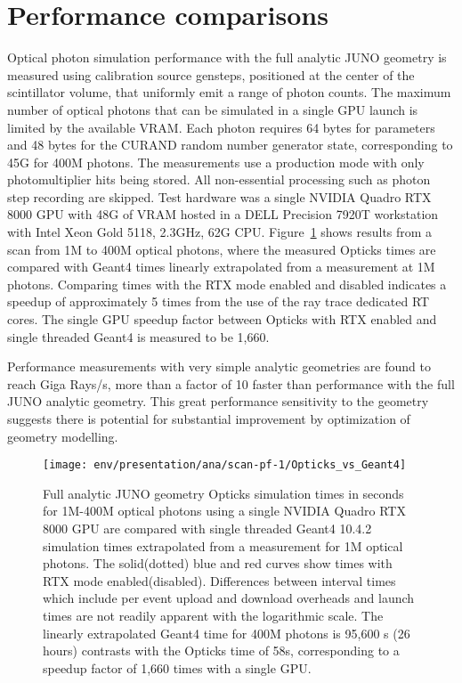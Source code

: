 \documentclass{webofc}
\begin{document}
\section{Performance comparisons}

Optical photon simulation performance with the full analytic JUNO geometry is measured 
using calibration source gensteps, positioned at the center of the scintillator volume, 
that uniformly emit a range of photon counts. 
The maximum number of optical photons that can be simulated in a single GPU launch is
limited by the available VRAM. Each photon requires 64 bytes for parameters  
and 48 bytes for the CURAND random number generator state, corresponding to 45G for 400M photons.
The measurements use a production mode with only photomultiplier hits being stored.
All non-essential processing such as photon step recording are skipped. Test hardware was a single 
NVIDIA Quadro RTX 8000 GPU with 48G of VRAM hosted in a DELL Precision 7920T workstation with 
Intel Xeon Gold 5118, 2.3GHz, 62G CPU. 
Figure~\ref{scanpf1vs} shows results from a scan from 1M to 400M optical photons, where the measured Opticks 
times are compared with Geant4 times linearly extrapolated from a measurement at 1M photons. 
Comparing times with the RTX mode enabled and disabled indicates a speedup of approximately 5 times
from the use of the ray trace dedicated RT cores.
The single GPU speedup factor between Opticks with RTX enabled and single threaded Geant4 
is measured to be 1,660.   

Performance measurements with very simple analytic geometries are found to reach Giga Rays/s, 
more than a factor of 10 faster than performance with the full JUNO analytic geometry. 
This great performance sensitivity to the geometry suggests there is potential for 
substantial improvement by optimization of geometry modelling. 
%
\begin{figure}
\centering
\texttt{[image: env/presentation/ana/scan-pf-1/Opticks\_vs\_Geant4]}
\caption{Full analytic JUNO geometry Opticks simulation times in seconds for 1M-400M optical photons using a single NVIDIA Quadro RTX 8000 GPU 
are compared with single threaded Geant4 10.4.2 simulation times extrapolated from a measurement for 1M optical photons. 
The solid(dotted) blue and red curves show times with RTX mode enabled(disabled). 
Differences between interval times which include per event upload and download overheads and launch 
times are not readily apparent with the logarithmic scale. The linearly extrapolated Geant4 time for 400M photons is 95,600 s (26 hours) 
contrasts with the Opticks time of 58s, corresponding to a speedup factor of 1,660 times with a single GPU.   
}
\label{scanpf1vs} 
\end{figure}
%
%
%
\end{document}
